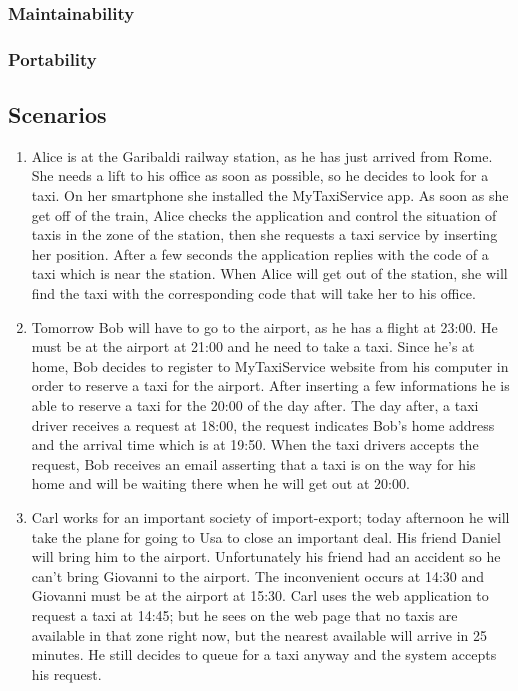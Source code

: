 \documentclass[11pt, a4paper,titlepage]{article}
\newcommand{\productname}{MyTaxiService }
\begin{document}
\subsubsection{Maintainability}
\subsubsection{Portability}
\subsection{Scenarios}
\begin{enumerate}
	\item Alice is at the Garibaldi railway station, as he has just arrived from Rome.
	She needs a lift to his office as soon as possible, so he decides to look for a taxi.
	On her smartphone she installed the \productname app.
	As soon as she get off of the train, Alice checks the application and control the situation of taxis in the zone of the station, then she requests a taxi service by inserting her position.
	After a few seconds the application replies with the code of a taxi which is near the station.
	When Alice will get out of the station, she will find the taxi with the corresponding code that will take her to his office.
	\item Tomorrow Bob will have to go to the airport, as he has a flight at 23:00.
	He must be at the airport at 21:00 and he need to take a taxi.
	Since he’s at home, Bob decides to register to \productname website from his computer in order to reserve a taxi for the airport. After inserting a few informations he is able to reserve a taxi for the 20:00 of the day after.
	The day after, a taxi driver receives a request at 18:00, the request indicates Bob’s home address and the arrival time which is at 19:50.
	When the taxi drivers accepts the request, Bob receives an email asserting that a taxi is on the way for his home and will be waiting there when he will get out at 20:00.
	\item Carl works for an important society of import-export; today afternoon he will take the plane for going to Usa to close an important deal. His friend Daniel will bring him to the airport.
	Unfortunately his friend had an accident so he can’t bring Giovanni to the airport.
	The inconvenient occurs at 14:30 and Giovanni must be at the airport at 15:30.
	Carl uses the web application to request a taxi at 14:45; but he sees on the web page that no taxis are available in that zone right now, but the nearest available will arrive in 25 minutes. He still decides to queue for a taxi anyway and the system accepts his request.
\end{enumerate}
\pagebreak
\end{document}
